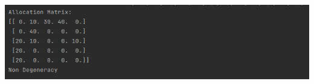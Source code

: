 \documentclass[12pt, letterpaper, twoside]{book}
\begin{document}
\includegraphics[height=200pt,width=550pt]{Output4}
\end{document}
